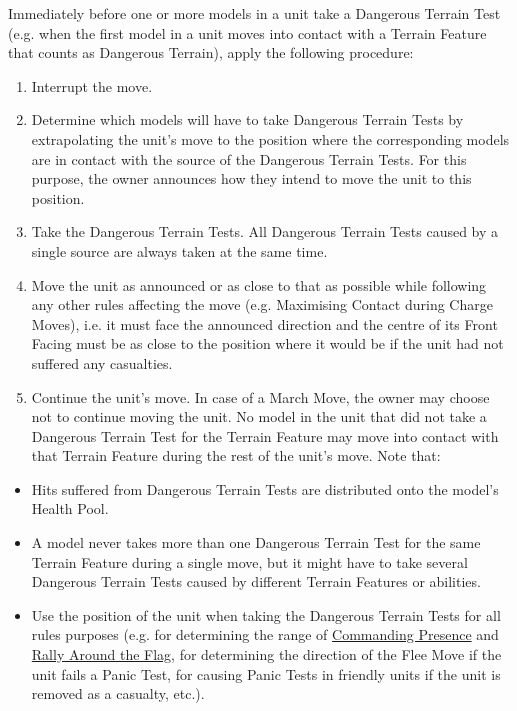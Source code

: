Immediately before one or more models in a unit take a Dangerous Terrain Test (e.g. when the first model in a unit moves into contact with a Terrain Feature that counts as Dangerous Terrain), apply the following procedure:
\begin{enumerate}
	\item Interrupt the move.
	\item Determine which models will have to take Dangerous Terrain Tests by extrapolating the unit's move to the position where the corresponding models are in contact with the source of the Dangerous Terrain Tests. For this purpose, the owner announces how they intend to move the unit to this position.
	\item Take the Dangerous Terrain Tests. All Dangerous Terrain Tests caused by a single source are always taken at the same time.
	\item Move the unit as announced or as close to that as possible while following any other rules affecting the move (e.g. Maximising Contact during Charge Moves), i.e. it must face the announced direction and the centre of its Front Facing must be as close to the position where it would be if the unit had not suffered any casualties.
	\item Continue the unit's move. In case of a March Move, the owner may choose not to continue moving the unit. No model in the unit that did not take a Dangerous Terrain Test for the Terrain Feature may move into contact with that Terrain Feature during the rest of the unit’s move. Note that:
\end{enumerate}
\begin{itemize}
	\item Hits suffered from Dangerous Terrain Tests are distributed onto the model's Health Pool.
	\item A model never takes more than one Dangerous Terrain Test for the same Terrain Feature during a single move, but it might have to take several Dangerous Terrain Tests caused by different Terrain Features or abilities.
	\item Use the position of the unit when taking the Dangerous Terrain Tests for all rules purposes (e.g. for determining the range of \hyperref[commanding_presence]{Commanding Presence} and \hyperref[rally_around_the_flag]{Rally Around the Flag}, for determining the direction of the Flee Move if the unit fails a Panic Test, for causing Panic Tests in friendly units if the unit is removed as a casualty, etc.).
\end{itemize}
	


